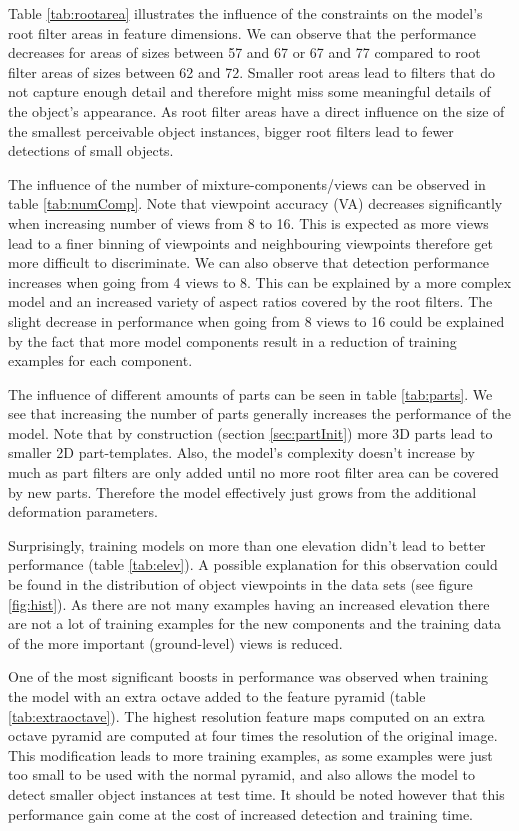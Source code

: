%
Table \ref{tab:rootarea} illustrates the influence of the constraints on the model's root filter areas in feature dimensions. We can observe that the performance decreases for areas of sizes between 57 and 67 or 67 and 77 compared to  root filter areas  of sizes between  62 and 72. Smaller root areas lead to filters that do not capture enough detail and therefore might miss some meaningful details of the object's appearance. As root filter areas have a direct influence on the size of the smallest perceivable object instances, bigger root filters lead to fewer detections of small objects. 

The influence of the number of mixture-components/views can be observed in table \ref{tab:numComp}. Note that viewpoint accuracy (VA) decreases significantly when increasing number of views from 8 to 16. This is expected as more views lead to a finer binning of viewpoints and neighbouring viewpoints therefore get more difficult to discriminate. We can also observe that detection performance increases when going from 4 views to  8. This can be explained by a more complex model and an increased variety of aspect ratios covered by the root filters. The slight decrease in performance when going from 8 views to 16 could be explained by the fact that more model components result in a reduction of training examples for each component. 

The influence of different amounts of parts can be seen in table \ref{tab:parts}. We see that increasing the number of parts generally increases the performance of the model. Note that by construction (section \ref{sec:partInit}) more 3D parts lead to smaller 2D part-templates. Also, the model's complexity doesn't increase by much  as part filters are only added until no more root filter area can be covered by new parts. Therefore the model effectively just grows from the additional deformation parameters. 

Surprisingly, training models on more than one elevation didn't lead to better performance (table \ref{tab:elev}). A possible explanation for this observation could be found in the distribution of object viewpoints in the data sets (see figure \ref{fig:hist}). As there are not many examples having an increased elevation there are not a lot of training examples for the new components and the training data of the more important (ground-level) views is reduced.

One of the most significant boosts in performance was observed when training the model with an extra octave added to the feature  pyramid (table \ref{tab:extraoctave}). The highest resolution feature maps computed on an extra octave pyramid are computed at four times the resolution of the original image. This modification leads to more training examples, as some examples were just too small to be used with the normal pyramid, and also allows the model to detect smaller object instances at test time. It should be noted however that this performance gain come at the cost of increased detection and training time. 

